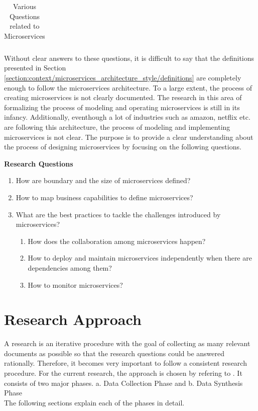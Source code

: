 \begin{enumerate}
\begin{table}[H]
\begin{adjustbox}{max width=\textwidth}
\begin{tabular}{*{14}{|c}|}
   \end{tabular}
\end{adjustbox}
  \caption{Various Questions related to Microservices}
  \label{tab:context/microservices_architecture_style/various_questions_related_to_microservices}
\end{table}
Without clear answers to these questions, it is difficult to say that the definitions presented in Section \ref{section:context/microservices_architecture_style/definitions} are completely enough to follow the microservices architecture. To a large extent, the process of creating microservices is not clearly documented. The research in this area of formalizing the process of modeling and operating microservices is still in its infancy. Additionally, eventhough a lot of industries such as amazon, netflix etc. are following this architecture, the process of modeling and implementing microservices is not clear. The purpose is to provide a clear understanding about the process of designing microservices by focusing on the following questions.
\begin{shaded}
\textbf{Research Questions}\label{list:introduction/research_questions}
\end{shaded}
\begin{enumerate}
\item How are boundary and the size of microservices defined?
\item How to map business capabilities to define microservices?
\item What are the best practices to tackle the challenges introduced by microservices?
    \begin{enumerate}
    \item How does the collaboration among microservices happen?
    \item How to deploy and maintain microservices independently when there are dependencies among them?
    \item How to monitor microservices?
    \end{enumerate}
\end{enumerate}
\section{Research Approach}\label{section:context/approach}
A research is an iterative procedure with the goal of collecting as many relevant documents as possible so that the research questions could be answered rationally. Therefore, it becomes very important to follow a consistent research procedure. For the current research, the approach is chosen by refering to \cite{np:2007aa}. It consists of two major phases.
a. {Data Collection Phase} and 
b. {Data Synthesis Phase}
\\
The following sections explain each of the phases in detail.

\end{enumerate}
